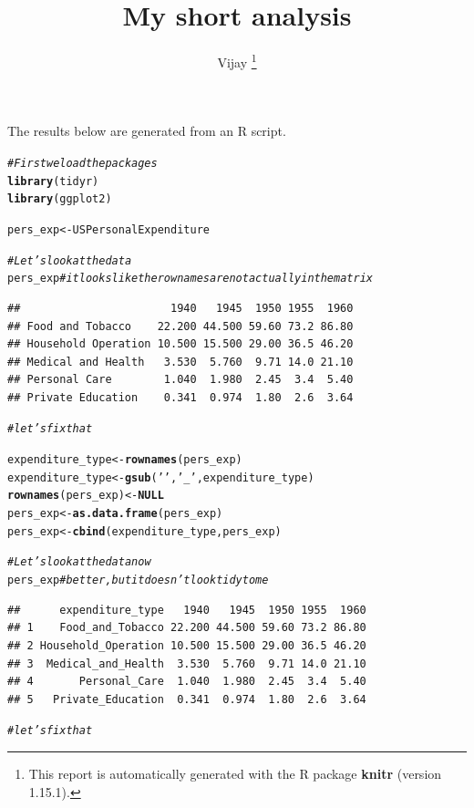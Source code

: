 \documentclass{article}\usepackage[]{graphicx}\usepackage[]{color}
\makeatletter
\newcommand{\hlstr}[1]{\textcolor[rgb]{0.192,0.494,0.8}{#1}}%
\newcommand{\hlcom}[1]{\textcolor[rgb]{0.678,0.584,0.686}{\textit{#1}}}%
\newcommand{\hlstd}[1]{\textcolor[rgb]{0.345,0.345,0.345}{#1}}%
\newcommand{\hlkwa}[1]{\textcolor[rgb]{0.161,0.373,0.58}{\textbf{#1}}}%
\newcommand{\hlkwb}[1]{\textcolor[rgb]{0.69,0.353,0.396}{#1}}%
\newcommand{\hlkwd}[1]{\textcolor[rgb]{0.737,0.353,0.396}{\textbf{#1}}}%
\newenvironment{kframe}{%
 \def\at@end@of@kframe{}%
 \ifinner\ifhmode%
  \def\at@end@of@kframe{\end{minipage}}%
  \begin{minipage}{\columnwidth}%
 \fi\fi%
 \def\FrameCommand##1{\hskip\@totalleftmargin \hskip-\fboxsep
 \colorbox{shadecolor}{##1}\hskip-\fboxsep
     \hskip-\linewidth \hskip-\@totalleftmargin \hskip\columnwidth}%
 \MakeFramed {\advance\hsize-\width
   \@totalleftmargin\z@ \linewidth\hsize
   \@setminipage}}%
 {\par\unskip\endMakeFramed%
 \at@end@of@kframe}
\newenvironment{knitrout}{}{} %
\makeatother
\begin{document}
\title{ My short analysis}

\author{ Vijay%
\thanks{This report is automatically generated with the R package \textbf{knitr}
        (version 1.15.1).}}

\maketitle
The results below are generated from an R script.

\begin{knitrout}
\color{fgcolor}\begin{kframe}
\begin{alltt}
\hlcom{# First we load the packages}
\hlkwd{library}\hlstd{(tidyr)}
\hlkwd{library}\hlstd{(ggplot2)}

\hlstd{pers_exp} \hlkwb{<-} \hlstd{USPersonalExpenditure}

\hlcom{# Let's look at the data}
\hlstd{pers_exp}        \hlcom{#it looks like the row names are not actually in the matrix}
\end{alltt}
\begin{verbatim}
##                       1940   1945  1950 1955  1960
## Food and Tobacco    22.200 44.500 59.60 73.2 86.80
## Household Operation 10.500 15.500 29.00 36.5 46.20
## Medical and Health   3.530  5.760  9.71 14.0 21.10
## Personal Care        1.040  1.980  2.45  3.4  5.40
## Private Education    0.341  0.974  1.80  2.6  3.64
\end{verbatim}
\begin{alltt}
                \hlcom{#let's fix that}

\hlstd{expenditure_type} \hlkwb{<-} \hlkwd{rownames}\hlstd{(pers_exp)}
\hlstd{expenditure_type} \hlkwb{<-} \hlkwd{gsub}\hlstd{(} \hlstr{' '} \hlstd{,} \hlstr{'_'} \hlstd{, expenditure_type)}
\hlkwd{rownames}\hlstd{(pers_exp)} \hlkwb{<-} \hlkwa{NULL}
\hlstd{pers_exp} \hlkwb{<-} \hlkwd{as.data.frame}\hlstd{(pers_exp)}
\hlstd{pers_exp} \hlkwb{<-} \hlkwd{cbind}\hlstd{(expenditure_type,pers_exp)}

\hlcom{# Let's look at the data now}
\hlstd{pers_exp}        \hlcom{#better, but it doesn't look tidy to me}
\end{alltt}
\begin{verbatim}
##      expenditure_type   1940   1945  1950 1955  1960
## 1    Food_and_Tobacco 22.200 44.500 59.60 73.2 86.80
## 2 Household_Operation 10.500 15.500 29.00 36.5 46.20
## 3  Medical_and_Health  3.530  5.760  9.71 14.0 21.10
## 4       Personal_Care  1.040  1.980  2.45  3.4  5.40
## 5   Private_Education  0.341  0.974  1.80  2.6  3.64
\end{verbatim}
\begin{alltt}
                \hlcom{#let's fix that}



\end{alltt}
\end{kframe}
\end{knitrout}
\end{document}
